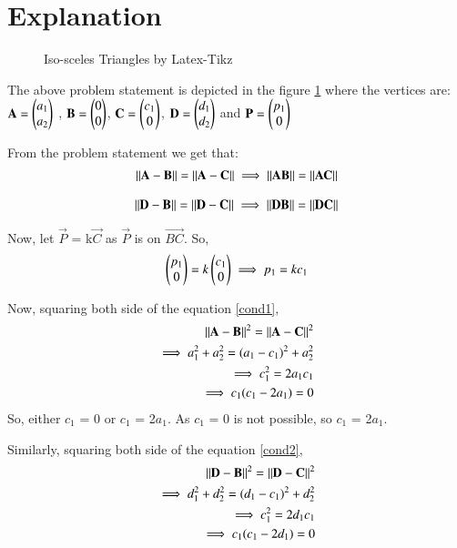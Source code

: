 \documentclass[journal,12pt,twocolumn]{IEEEtran}
\begin{document}
\section{Explanation}
\begin{figure}[!ht]
\centering
\resizebox{\columnwidth}{!}{}
\caption{Iso-sceles Triangles by Latex-Tikz}
\label{fig:iso_scelen}	
\end{figure}

The above problem statement is depicted in the figure \ref{fig:iso_scelen} where the vertices are: $\mathbf{A} = \begin{pmatrix}a_1\\a_2\end{pmatrix}$ , $\mathbf{B} = \begin{pmatrix}0\\0\end{pmatrix}$, $\mathbf{C} = \begin{pmatrix}c_1\\0\end{pmatrix}$, $\mathbf{D} = \begin{pmatrix}d_1\\d_2\end{pmatrix}$ and $\mathbf{P} = \begin{pmatrix}p_1\\0\end{pmatrix}$

From the problem statement we get that:
\begin{align}
\left\lVert\mathbf{A}-\mathbf{B}\right\rVert = \left\lVert\mathbf{A}-\mathbf{C}\right\rVert
\implies \left\lVert\mathbf{AB}\right\rVert = \left\lVert\mathbf{AC}\right\rVert
\end{align}
\label{cond1}

\begin{align}
\left\lVert\mathbf{D}-\mathbf{B}\right\rVert = \left\lVert\mathbf{D}-\mathbf{C}\right\rVert
\implies \left\lVert\mathbf{DB}\right\rVert = \left\lVert\mathbf{DC}\right\rVert
\end{align}
\label{cond2}

Now, let $\vec{P}$ = k$\vec{C}$ as $\vec{P}$ is on $\vec{BC}$.
So, 
\begin{align}
\begin{pmatrix}p_1\\0\end{pmatrix} = k\begin{pmatrix}c_1\\0\end{pmatrix}
\implies p_1 = kc_1
\end{align}

Now, squaring both side of the equation \ref{cond1},
\begin{align}
\left\lVert\mathbf{A}-\mathbf{B}\right\rVert^2 = \left\lVert\mathbf{A}-\mathbf{C}\right\rVert^2\\
\implies a_1^2 + a_2^2 = (a_1- c_1)^2 + a_2^2\\
\implies c_1^2 = 2a_1 c_1\\
\implies c_1(c_1 - 2a_1) = 0\label{cond3}
\end{align}
\label{cond3}
So, either $c_1$ = 0 or $c_1$ = 2$a_1$. As $c_1$ = 0 is not possible, so $c_1$ = 2$a_1$.

Similarly, squaring both side of the equation \ref{cond2},
\begin{align}
\left\lVert\mathbf{D}-\mathbf{B}\right\rVert^2 = \left\lVert\mathbf{D}-\mathbf{C}\right\rVert^2\\
\implies d_1^2 + d_2^2 = (d_1- c_1)^2 + d_2^2\\
\implies c_1^2 = 2d_1 c_1\\
\implies c_1(c_1 - 2d_1) = 0\label{cond4}
\end{align}
\label{cond4}
\end{document}

